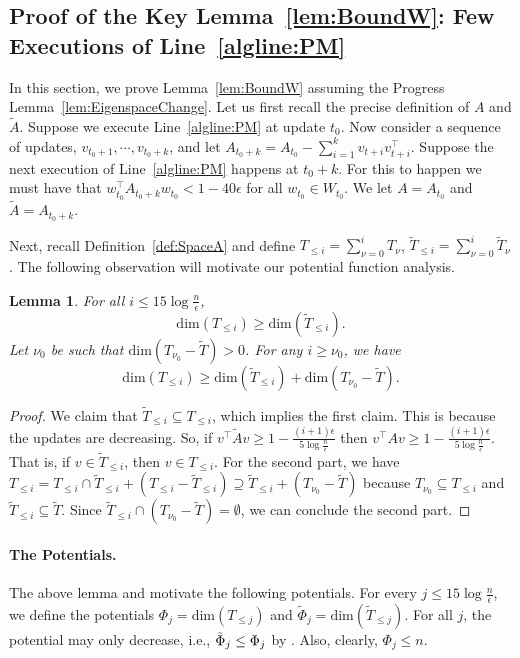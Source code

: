 \documentclass[11pt]{article}
\newtheorem{lemma}[theorem]{Lemma}
\def\dim#1{\mathrm{dim} (#1)}
\newcommand\vv{\boldsymbol{\mathit{v}}}
\newcommand\ww{\boldsymbol{\mathit{w}}}
\renewcommand\AA{\boldsymbol{\mathit{A}}}
\newcommand\WW{\boldsymbol{\mathit{W}}}
\newcommand\Ttil{{\tilde{\mathit{T}}}}
\newcommand\AAtil{\boldsymbol{\widetilde{\mathit{A}}}}
\begin{document}
\subsection{Proof of the Key Lemma~\ref{lem:BoundW}: Few Executions of Line~\ref{algline:PM}}

\label{sec:proof key}

In this section, we prove Lemma~\ref{lem:BoundW} assuming the Progress Lemma~\ref{lem:EigenspaceChange}. 
Let us first recall the precise definition of $\AA$ and $\AAtil$. Suppose we execute Line~\ref{algline:PM} at update $t_{0}$. Now consider a sequence of updates, $\vv_{t_{0}+1},\cdots,\vv_{t_{0}+k}$, and let $\AA_{t_{0}+k}=\AA_{t_{0}}-\sum_{i=1}^{k}\vv_{t+i}\vv_{t+i}^{\top}.$ Suppose the next execution of Line~\ref{algline:PM} happens at $t_{0}+k$. For this to happen we must have that $\ww_{t_{0}}^{\top}\AA_{t_{0}+k}\ww_{t_{0}}<1-40\epsilon$ for all $\ww_{t_{0}}\in\WW_{t_{0}}$. We let $\AA=\AA_{t_{0}}$ and $\AAtil=\AA_{t_{0}+k}$. 

Next, recall Definition~\ref{def:SpaceA} and define $T_{\leq i}=\sum_{\nu=0}^{i}T_{\nu}$, $\tilde{T}_{\leq i}=\sum_{\nu=0}^{i}\tilde{T}_{\nu}$. The following observation will motivate our potential function analysis.
\begin{lemma}
	\label{lem:Monotone} For all $i\leq15\log\frac{n}{\epsilon}$, 
	\[
	\dim{T_{\le i}}\ge\dim{\Ttil_{\le i}}.
	\]
	Let $\nu_{0}$ be such that $\dim{T_{\nu_{0}}-\tilde{T}}>0$. For any $i\ge\nu_{0}$, we have
	\[
	\dim{T_{\le i}}\geq\dim{\Ttil_{\le i}}+\dim{T_{\nu_{0}}-\Ttil}.
	\]
	
\end{lemma}

\begin{proof}
	We claim that $\tilde{T}_{\leq i}\subseteq T_{\leq i}$, which implies the first claim. This is because the updates are decreasing. So, if $\vv^{\top}\AAtil\vv\geq1-\frac{(i+1)\epsilon}{5\log\frac{n}{\epsilon}}$ then $\vv^{\top}\AA\vv\geq1-\frac{(i+1)\epsilon}{5\log\frac{n}{\epsilon}}$. That is, if $\vv\in\Ttil_{\le i}$, then $\vv\in T_{\leq i}$. For the second part, we have $T_{\leq i}=T_{\leq i}\cap\tilde{T}_{\leq i}+(T_{\leq i}-\tilde{T}_{\leq i})\supseteq\tilde{T}_{\leq i}+(T_{\nu_{0}}-\tilde{T})$ because $T_{\nu_{0}}\subseteq T_{\le i}$ and $\Ttil_{\le i}\subseteq\Ttil$. Since $\tilde{T}_{\leq i}\cap(T_{\nu_{0}}-\tilde{T})=\emptyset$, we can conclude the second part.
\end{proof}

\paragraph{The Potentials.}
The above lemma and  motivate the following potentials.
For every $j\le15\log\frac{n}{\epsilon}$, we define the potentials $\Phi_{j}=\dim{T_{\le j}}$ and $\tilde{\Phi}_{j}=\dim{\Ttil_{\le j}}$. For all $j$, the potential may only decrease, i.e., $\tilde{\Phi}_{j}\le\Phi_{j}$ by . Also, clearly, $\Phi_{j}\le n$. 
\end{document}
